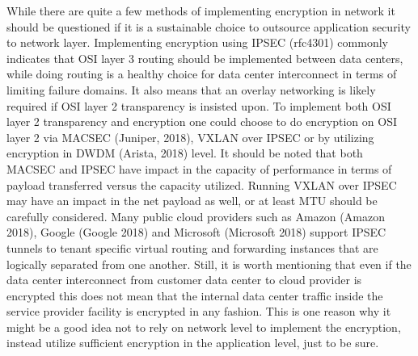 \documentclass{article}
\begin{document}
While there are quite a few methods of implementing encryption in network it should be questioned if it is a sustainable choice to outsource application security to network layer. Implementing encryption using IPSEC (rfc4301) commonly indicates that OSI layer 3 routing should be implemented between data centers, while doing routing is a healthy choice for data center interconnect in terms of limiting failure domains. It also means that an overlay networking is likely required if OSI layer 2 transparency is insisted upon. To implement both OSI layer 2 transparency and encryption one could choose to do encryption on OSI layer 2 via MACSEC (Juniper, 2018), VXLAN over IPSEC or by utilizing encryption in DWDM (Arista, 2018) level. It should be noted that both MACSEC and IPSEC have impact in the capacity of performance in terms of payload transferred versus the capacity utilized. Running VXLAN over IPSEC may have an impact in the net payload as well, or at least MTU should be carefully considered. Many public cloud providers such as Amazon (Amazon 2018), Google (Google 2018) and Microsoft (Microsoft 2018) support IPSEC tunnels to tenant specific virtual routing and forwarding instances that are logically separated from one another. Still, it is worth mentioning that even if the data center interconnect from customer data center to cloud provider is encrypted this does not mean that the internal data center traffic inside the service provider facility is encrypted in any fashion. This is one reason why it might be a good idea not to rely on network level to implement the encryption, instead utilize sufficient encryption in the application level, just to be sure.
\end{document}
